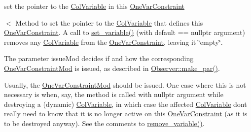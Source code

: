 set the pointer to the \mbox{\hyperlink{class_s_m_spp__di__unipi__it_1_1_col_variable}{Col\+Variable}} in this \mbox{\hyperlink{class_s_m_spp__di__unipi__it_1_1_one_var_constraint}{One\+Var\+Constraint}} 

$<$ Method to set the pointer to the \mbox{\hyperlink{class_s_m_spp__di__unipi__it_1_1_col_variable}{Col\+Variable}} that defines this \mbox{\hyperlink{class_s_m_spp__di__unipi__it_1_1_one_var_constraint}{One\+Var\+Constraint}}. A call to \mbox{\hyperlink{class_s_m_spp__di__unipi__it_1_1_one_var_constraint_a1a242762e0f2821e2676a295a766fdb6}{set\+\_\+variable()}} (with default == nullptr argument) removes any \mbox{\hyperlink{class_s_m_spp__di__unipi__it_1_1_col_variable}{Col\+Variable}} from the \mbox{\hyperlink{class_s_m_spp__di__unipi__it_1_1_one_var_constraint}{One\+Var\+Constraint}}, leaving it \char`\"{}empty\char`\"{}.

The parameter issue\+Mod decides if and how the corresponding \mbox{\hyperlink{class_s_m_spp__di__unipi__it_1_1_one_var_constraint_mod}{One\+Var\+Constraint\+Mod}} is issued, as described in \mbox{\hyperlink{class_s_m_spp__di__unipi__it_1_1_observer_a2d499ae38e5e95cf66cd71da32b0694a}{Observer\+::make\+\_\+par()}}.

Usually, the \mbox{\hyperlink{class_s_m_spp__di__unipi__it_1_1_one_var_constraint_mod}{One\+Var\+Constraint\+Mod}} should be issued. One case where this is not necessary is when, say, the method is called with nullptr argument while destroying a (dynamic) \mbox{\hyperlink{class_s_m_spp__di__unipi__it_1_1_col_variable}{Col\+Variable}}, in which case the affected \mbox{\hyperlink{class_s_m_spp__di__unipi__it_1_1_col_variable}{Col\+Variable}} don\textquotesingle{}t really need to know that it is no longer active on this \mbox{\hyperlink{class_s_m_spp__di__unipi__it_1_1_one_var_constraint}{One\+Var\+Constraint}} (as it is to be destroyed anyway). See the comments to \mbox{\hyperlink{class_s_m_spp__di__unipi__it_1_1_one_var_constraint_ade52d9ebf47de895377b860ef4d3a607}{remove\+\_\+variable()}}. \mbox{\label{class_s_m_spp__di__unipi__it_1_1_one_var_constraint_ad0b5bcf42a678385fdba6fe41ce9626b}} 
